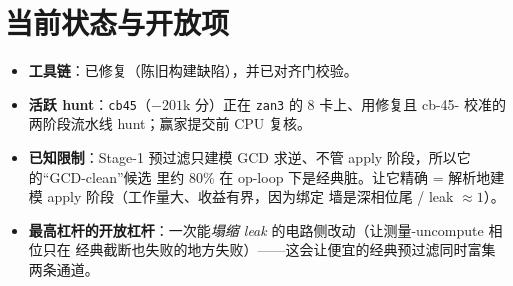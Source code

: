 \documentclass[11pt]{ctexart}
\let\c\lstinline
\begin{document}
\section{当前状态与开放项}
\begin{itemize}[nosep]
  \item \textbf{工具链}：已修复（陈旧构建缺陷），并已对齐门校验。
  \item \textbf{活跃 hunt}：\c{cb45}（$-201$k 分）正在 \texttt{zan3} 的 $8$ 卡上、用修复且 cb-45-
  校准的两阶段流水线 hunt；赢家提交前 CPU 复核。
  \item \textbf{已知限制}：Stage-1 预过滤只建模 GCD 求逆、不管 apply 阶段，所以它的``GCD-clean''候选
  里约 $80\%$ 在 op-loop 下是经典脏。让它精确 = 解析地建模 apply 阶段（工作量大、收益有界，因为绑定
  墙是深相位尾 / leak $\approx 1$）。
  \item \textbf{最高杠杆的开放杠杆}：一次能\emph{塌缩 leak} 的电路侧改动（让测量-uncompute 相位只在
  经典截断也失败的地方失败）——这会让便宜的经典预过滤同时富集两条通道。
\end{itemize}
\end{document}
